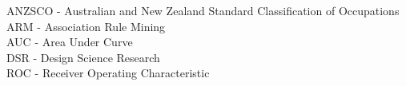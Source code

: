 \begin{abbreviation}
    \noindent ANZSCO - Australian and New Zealand Standard Classification
    of Occupations\\[0.1cm]
    \noindent ARM - Association Rule Mining\\[0.1cm]
    \noindent AUC - Area Under Curve\\[0.1cm]
    \noindent DSR - Design Science Research\\[0.1cm]
    \noindent ROC - Receiver Operating Characteristic\\[0.1cm]
\end{abbreviation}
